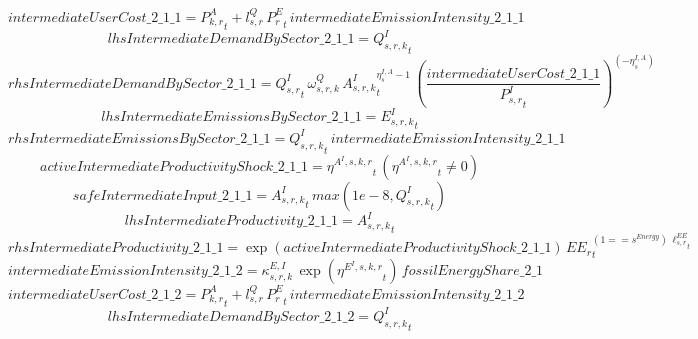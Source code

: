 \begin{dmath*}
intermediateUserCost\_2\_1\_1 = {{P^{A}_{k,r}}}_{t}+{{l^{Q}_{s,r}}}\, {{P^E_r}}_{t}\, {intermediateEmissionIntensity\_2\_1\_1}
\end{dmath*}
\begin{dmath*}
lhsIntermediateDemandBySector\_2\_1\_1 = {{Q^{I}_{s,r,k}}}_{t}
\end{dmath*}
\begin{dmath*}
rhsIntermediateDemandBySector\_2\_1\_1 = {{Q^{I}_{s,r}}}_{t}\, {{\omega^{Q}_{s,r,k}}}\, {{A^{I}_{s,r,k}}}_{t}^{{{\eta^{I,A}_{s}}}-1}\, \left(\frac{{intermediateUserCost\_2\_1\_1}}{{{P^{I}_{s,r}}}_{t}}\right)^{\left(-{{\eta^{I,A}_{s}}}\right)}
\end{dmath*}
\begin{dmath*}
lhsIntermediateEmissionsBySector\_2\_1\_1 = {{E^I_{s,r,k}}}_{t}
\end{dmath*}
\begin{dmath*}
rhsIntermediateEmissionsBySector\_2\_1\_1 = {{Q^{I}_{s,r,k}}}_{t}\, {intermediateEmissionIntensity\_2\_1\_1}
\end{dmath*}
\begin{dmath*}
activeIntermediateProductivityShock\_2\_1\_1 = {{\eta^{A^{I},s,k,r}}}_{t}\, \left({{\eta^{A^{I},s,k,r}}}_{t}\neq 0\right)
\end{dmath*}
\begin{dmath*}
safeIntermediateInput\_2\_1\_1 = {{A^{I}_{s,r,k}}}_{t}\, max(1e-8,{{Q^{I}_{s,r,k}}}_{t})
\end{dmath*}
\begin{dmath*}
lhsIntermediateProductivity\_2\_1\_1 = {{A^{I}_{s,r,k}}}_{t}
\end{dmath*}
\begin{dmath*}
rhsIntermediateProductivity\_2\_1\_1 = \exp\left({activeIntermediateProductivityShock\_2\_1\_1}\right)\, {{EE_r}}_{t}^{\left(1=={{s^{Energy}}}\right)\, {{\ell^{EE}_{s,r}}}_{t}}
\end{dmath*}
\begin{dmath*}
intermediateEmissionIntensity\_2\_1\_2 = {{\kappa^{E,I}_{s,r,k}}}\, \exp\left({{\eta^{E^{I},s,k,r}}}_{t}\right)\, {fossilEnergyShare\_2\_1}
\end{dmath*}
\begin{dmath*}
intermediateUserCost\_2\_1\_2 = {{P^{A}_{k,r}}}_{t}+{{l^{Q}_{s,r}}}\, {{P^E_r}}_{t}\, {intermediateEmissionIntensity\_2\_1\_2}
\end{dmath*}
\begin{dmath*}
lhsIntermediateDemandBySector\_2\_1\_2 = {{Q^{I}_{s,r,k}}}_{t}
\end{dmath*}
